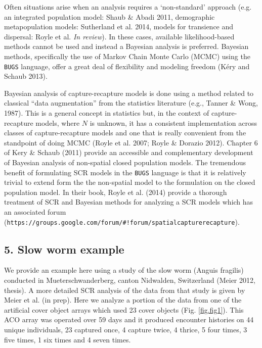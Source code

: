 \documentclass{book}
\begin{document}
Often situations arise when an analysis requires a `non-standard' approach (e.g. an integrated population model: Shaub \& Abadi 2011, demographic metapopulation models: Sutherland et al. 2014, models for transience and dispersal: Royle et al. {\it In review}). In these cases, available likelihood-based methods cannot be used and instead a Bayesian analysis is preferred. Bayesian methods, specifically the use of Markov Chain Monte Carlo (MCMC) using the {\tt BUGS} language, offer a great deal of flexibility and modeling freedom (K\'{e}ry and Schaub 2013).

Bayesian analysis of capture-recapture models is done using a method
related to classical ``data augmentation'' from the statistics
literature (e.g., Tanner \& Wong, 1987).  This is a general concept in
statistics but, in the context of capture-recapture models, where $N$
is unknown, it has a consistent implementation across classes of
capture-recapture models and one that is really convenient from the
standpoint of doing MCMC (Royle et al. 2007; Royle \& Dorazio
2012). Chapter 6 of Kery \& Schaub (2011) provide an accessible and
complementary development of Bayesian analysis of non-spatial closed
population models. The tremendous benefit of formulating SCR models in
the {\tt BUGS} language is that it is relatively trivial to extend
form the the non-spatial model to the formulation on the closed
population model. In their book, Royle et al. (2014) provide a
thorough treatment of SCR and Bayesian methods for
analyzing a SCR models which has an associated forum
(\verb|https://groups.google.com/forum/#!forum/spatialcapturerecapture|).

\subsection*{5. Slow worm example}

We provide an example here using a study of the slow worm (Anguis
fragilis) conducted in Mueterschwanderberg, canton Nidwalden,
Switzerland (Meier 2012, thesis). A more detailed SCR analysis of the
data from that study is given by Meier et al. (in prep). Here we
analyze a portion of the data from one of the artificial cover object
arrays which used 23 cover objects (Fig. \ref{fig.fig1}). This ACO
array was operated over 59 days and it produced encounter histories on
44 unique individuals, 23 captured once, 4 capture twice, 4 thrice, 5
four times, 3 five times, 1 six times and 4 seven times.
\end{document}
